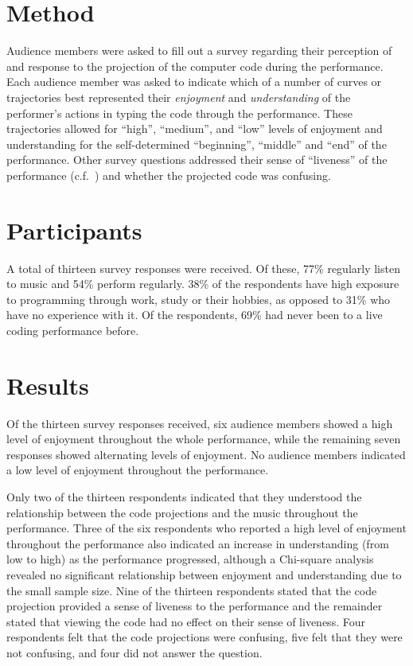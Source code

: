 \section{Method}

Audience members were asked to fill out a survey regarding their perception of and response to the projection of the computer code during the
performance. Each audience member was asked to indicate which of a
number of curves or trajectories best represented their \emph{enjoyment}
and \emph{understanding} of the performer's actions in typing the code
through the performance. These trajectories allowed for ``high'',
``medium'', and ``low'' levels of enjoyment and understanding for the
self-determined ``beginning'', ``middle'' and ``end'' of the
performance. Other survey questions addressed their sense of
``liveness'' of the performance (c.f.~\cite{Auslander}) and whether
the projected code was confusing.

\section{Participants}

A total of thirteen survey responses were received. Of these, 77\% regularly listen to music and 54\% perform regularly. 38\% of the respondents have high exposure to programming through work, study or their hobbies, as opposed to 31\% who have no experience with it. Of the respondents, 69\% had never been to a live coding performance before.

\section{Results}

Of the thirteen survey responses received, six audience members showed
a high level of enjoyment throughout the whole performance, while the
remaining seven responses showed alternating levels of enjoyment. No
audience members indicated a low level of enjoyment throughout the
performance.

Only two of the thirteen respondents indicated that they understood
the relationship between the code projections and the music throughout
the performance. Three of the six respondents who reported a high
level of enjoyment throughout the performance also indicated an
increase in understanding (from low to high) as the performance
progressed, although a Chi-square analysis revealed no significant
relationship between enjoyment and understanding due to the small
sample size. Nine of the thirteen respondents stated that the code
projection provided a sense of liveness to the performance and the
remainder stated that viewing the code had no effect on their sense of
liveness. Four respondents felt that the code projections were
confusing, five felt that they were not confusing, and four did not
answer the question.

